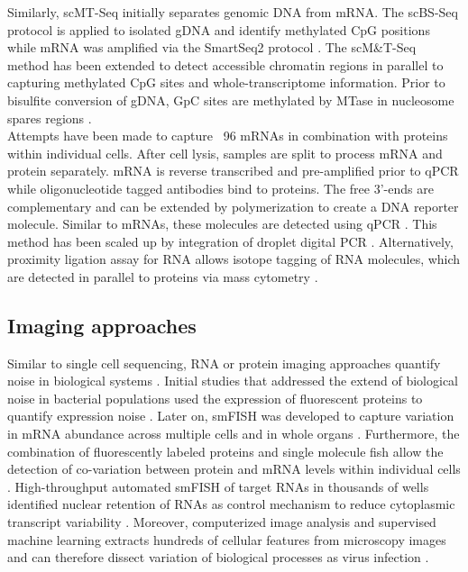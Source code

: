 Similarly, \gls{scMT-Seq} initially separates genomic DNA from mRNA. The scBS-Seq protocol is applied to isolated gDNA and identify methylated CpG positions while mRNA was amplified via the SmartSeq2 protocol \citep{Angermueller2016a}. The scM\&{}T-Seq method has been extended to detect accessible chromatin regions in parallel to capturing methylated CpG sites and whole-transcriptome information. Prior to bisulfite conversion of gDNA, GpC sites are methylated by MTase in nucleosome spares regions \citep{Pott2017, Clark2018}.\\
 
Attempts have been made to capture ~96 mRNAs in combination with proteins within individual cells. After cell lysis, samples are split to process mRNA and protein separately. mRNA is reverse transcribed and pre-amplified prior to \gls{qPCR} while oligonucleotide tagged antibodies bind to proteins. The free 3’-ends are complementary and can be extended by polymerization to create a DNA reporter molecule. Similar to mRNAs, these molecules are detected using qPCR \citep{Darmanis2016}. This method has been scaled up by integration of droplet digital PCR \citep{Albayrak2016}. Alternatively, proximity ligation assay for RNA allows isotope tagging of RNA molecules, which are detected in parallel to proteins via mass cytometry \citep{Frei2016}.

\subsection{Imaging approaches}

Similar to single cell sequencing, RNA or protein imaging approaches quantify noise in biological systems \citep{Harton2017a}. Initial studies that addressed the extend of biological noise in bacterial populations used the expression of fluorescent proteins to quantify expression noise \citep{Elowitz2002, Blake2003}. Later on, \gls{smFISH} was developed to capture variation in mRNA abundance across multiple cells \citep{Fang2013a, Lyubimova2013, Sanchez2013} and in whole organs \citep{Yang2014b}. Furthermore, the combination of fluorescently labeled proteins and single molecule fish allow the detection of co-variation between protein and mRNA levels within individual cells \citep{Taniguchi2011}. High-throughput automated smFISH of target RNAs in thousands of wells \citep{Battich2013} identified nuclear retention of RNAs as control mechanism to reduce cytoplasmic transcript variability \citep{Battich2015a}. Moreover, computerized image analysis and supervised machine learning extracts hundreds of cellular features from microscopy images and can therefore dissect variation of biological processes as virus infection \citep{Snijder2009}.\\

